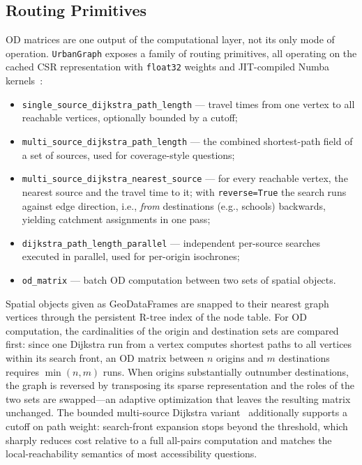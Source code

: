\documentclass[smartcities,article,submit,moreauthors]{Definitions/mdpi}
\begin{document}
    \subsection{Routing Primitives}
    \label{subsec:routing}

    OD matrices are one output of the computational layer, not its only mode of operation.
    \texttt{UrbanGraph} exposes a family of routing primitives, all operating on the cached CSR
    representation with \texttt{float32} weights and JIT-compiled Numba kernels~\cite{lam2015numba}:

    \begin{itemize}
        \item \texttt{single\_source\_dijkstra\_path\_length} --- travel times from one vertex to all
        reachable vertices, optionally bounded by a cutoff;
        \item \texttt{multi\_source\_dijkstra\_path\_length} --- the combined shortest-path field of a
        set of sources, used for coverage-style questions;
        \item \texttt{multi\_source\_dijkstra\_nearest\_source} --- for every reachable vertex, the
        nearest source and the travel time to it; with \texttt{reverse=True} the search runs against
        edge direction, i.e., \emph{from} destinations (e.g., schools) backwards, yielding catchment
        assignments in one pass;
        \item \texttt{dijkstra\_path\_length\_parallel} --- independent per-source searches executed in
        parallel, used for per-origin isochrones;
        \item \texttt{od\_matrix} --- batch OD computation between two sets of spatial objects.
    \end{itemize}

    Spatial objects given as GeoDataFrames are snapped to their nearest graph vertices through the
    persistent R-tree index of the node table.
    For OD computation, the cardinalities of the origin and destination sets are compared first: since
    one Dijkstra run from a vertex computes shortest paths to all vertices within its search front, an
    OD matrix between $n$ origins and $m$ destinations requires $\min(n,m)$ runs.
    When origins substantially outnumber destinations, the graph is reversed by transposing its sparse
    representation and the roles of the two sets are swapped---an adaptive optimization that leaves the
    resulting matrix unchanged.
    The bounded multi-source Dijkstra variant~\cite{dijkstra2022note} additionally supports a cutoff on
    path weight: search-front expansion stops beyond the threshold, which sharply reduces cost relative
    to a full all-pairs computation and matches the local-reachability semantics of most accessibility
    questions.
\end{document}
